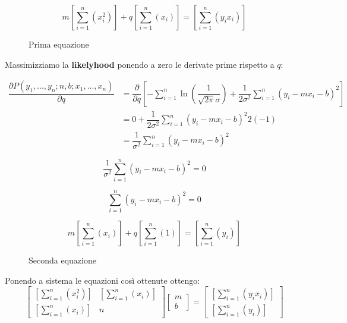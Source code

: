 \documentclass[\main/main.tex]{subfiles}
\begin{document}
\begin{figure}[H]
	\[
		m\left [ \sum_{i=1}^n \left(x_i^2 \right) \right ] + q \left [ \sum_{i=1}^n \left(x_i \right) \right ] = \left [ \sum_{i=1}^n \left(y_i x_i \right) \right ]
	\]
	\caption{Prima equazione}
\end{figure}

Massimizziamo la \textbf{likelyhood} ponendo a zero le derivate prime rispetto a $q$:

\begin{align}
	\dfrac{\partial P \left(y_1,...,y_n; n, b; x_1, ..., x_n \right)}{\partial q} & = \dfrac{\partial}{\partial q} \left [ - \sum_{i=1}^n \ln
		\left ( \dfrac{1}{\sqrt{2\pi}\sigma} \right )
		+ \dfrac{1}{2\sigma^2} \sum_{i=1}^n
		\left(y_i - mx_i - b \right)^2
		\right ]                                                                                                                                                      \\
	                                                                              & = 0 + \dfrac{1}{2\sigma^2} \sum_{i=1}^n \left(y_i - mx_i - b \right)^2 2 (-1) \\
	                                                                              & = \dfrac{1}{\sigma^2} \sum_{i=1}^n \left(y_i - mx_i - b \right)^2
\end{align}

\[
	\dfrac{1}{\sigma^2} \sum_{i=1}^n \left(y_i - mx_i - b \right)^2  = 0
\]

\[
	\sum_{i=1}^n \left(y_i - mx_i - b \right)^2 = 0
\]

\begin{figure}[H]
	\[
		m\left [ \sum_{i=1}^n \left(x_i \right) \right ] + q \left [ \sum_{i=1}^n \left(1 \right) \right ] = \left [ \sum_{i=1}^n \left(y_i \right) \right ]
	\]
	\caption{Seconda equazione}
\end{figure}

Ponendo a sistema le equazioni così ottenute ottengo:
\[
	\begin{bmatrix}
		\left [ \sum_{i=1}^n \left(x_i^2 \right) \right ] & \left [ \sum_{i=1}^n \left(x_i \right) \right ] \\
		\left [ \sum_{i=1}^n \left(x_i \right) \right ]   & n
	\end{bmatrix}
	\begin{bmatrix}
		m \\
		b
	\end{bmatrix}
	=
	\begin{bmatrix}
		\left [ \sum_{i=1}^n \left(y_i x_i \right) \right ] \\
		\left [ \sum_{i=1}^n \left(y_i \right) \right ]
	\end{bmatrix}
\]
\end{document}
